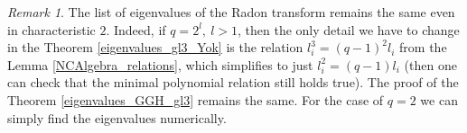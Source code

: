 \documentclass[12pt,reqno]{amsart}
\theoremstyle{definition}
\theoremstyle{remark}
\newtheorem{rem}[thm]{Remark}
\numberwithin{equation}{section}
\DeclareMathOperator{\R}{\mathcal{R}}
\def\IM#1{\textcolor[rgb]{0.00,0.00,0.75}{[I: #1]}}
\begin{document}
\begin{rem}
    The list of eigenvalues of the Radon transform remains the same even in characteristic $2$. Indeed, if $q=2^l,\ l>1$, then the only detail we have to change in the Theorem \ref{eigenvalues_gl3_Yok} is the relation $l_i^3=(q-1)^2l_i$ from the Lemma \ref{NCAlgebra_relations}, which simplifies to just $l_i^2=(q-1)l_i$ (then one can check that the minimal polynomial relation still holds true). The proof of the Theorem \ref{eigenvalues_GGH_gl3} remains the same. For the case of $q=2$ we can simply find the eigenvalues numerically.
\end{rem}

\end{document}
